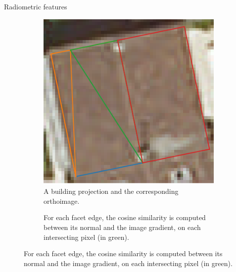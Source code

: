 \documentclass[export]{beamer}
\begin{document}
            \begin{frame}{Radiometric features}
                \begin{figure}
                    \begin{subfigure}{.48\textwidth}
                        \includegraphics[width=\textwidth]{images/radio_vector}
                        \caption{\label{fig::ortho_sup} A building projection and the corresponding orthoimage.}
                    \end{subfigure}
                    \begin{subfigure}{.48\textwidth}
                        
                        \caption{\label{fig::hist} For each facet edge, the cosine similarity is computed between its normal and the image gradient, on each intersecting pixel (in green).}
                    \end{subfigure}
                \end{figure}
            \end{frame}
        
\end{document}
